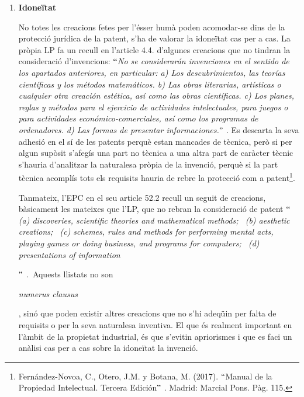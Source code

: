 \documentclass[12pt]{article}
\begin{document}
\vspace{\baselineskip}
\begin{enumerate}
	\item \textbf{Idoneïtat }\par


\vspace{\baselineskip}
\begin{justify}
No totes les creacions fetes per l’ésser humà poden acomodar-se dins de la protecció jurídica de la patent, s’ha de valorar la idoneïtat cas per a cas. La pròpia LP fa un recull en l’article 4.4. d’algunes creacions que no tindran la consideració d’invencions: \textit{$``$No se considerarán invenciones en el sentido de los apartados anteriores, en particular: a) Los descubrimientos, las teorías científicas y los métodos matemáticos. b) Las obras literarias, artísticas o cualquier otra creación estética, así como las obras científicas. c) Los planes, reglas y métodos para el ejercicio de actividades intelectuales, para juegos o para actividades económico-comerciales, así como los programas de ordenadores. d) Las formas de presentar informaciones.$"$ }. Es descarta la seva adhesió en el sí de les patents perquè estan mancades de tècnica, però si per algun supòsit s’afegís una part no tècnica a una altra part de caràcter tècnic s’hauria d’analitzar la naturalesa pròpia de la invenció, perquè si la part tècnica acomplís tots els requisits hauria de rebre la protecció com a patent\footnote{ Fernández-Novoa, C., Otero, J.M. y Botana, M. (2017). $``$Manual de la Propiedad Intelectual. Tercera Edición$"$ . Madrid: Marcial Pons. Pàg. 115. }. 
\end{justify}\par


\vspace{\baselineskip}
\begin{justify}
Tanmateix, l’EPC en el seu article 52.2 recull un seguit de creacions, bàsicament les mateixes que l’LP, que no rebran la consideració de patent \textit{$``$(a) discoveries, scientific theories and mathematical methods;  (b) aesthetic creations;  (c) schemes, rules and methods for performing mental acts, playing games or doing business, and programs for computers;  (d) presentations of information}{\fontsize{11pt}{13.2pt}\selectfont \textit{$"$ . }Aquests llistats no son \par}\textit{numerus clausus}{\fontsize{11pt}{13.2pt}\selectfont , sinó que poden existir altres creacions que no s’hi adeqüin per falta de requisits o per la seva naturalesa inventiva. El que és realment important en l’àmbit de la propietat industrial, és que s’evitin apriorismes i que es faci un anàlisi cas per a cas sobre la idoneïtat la invenció. \par}
\end{justify}\par



\end{enumerate}
\end{document}
